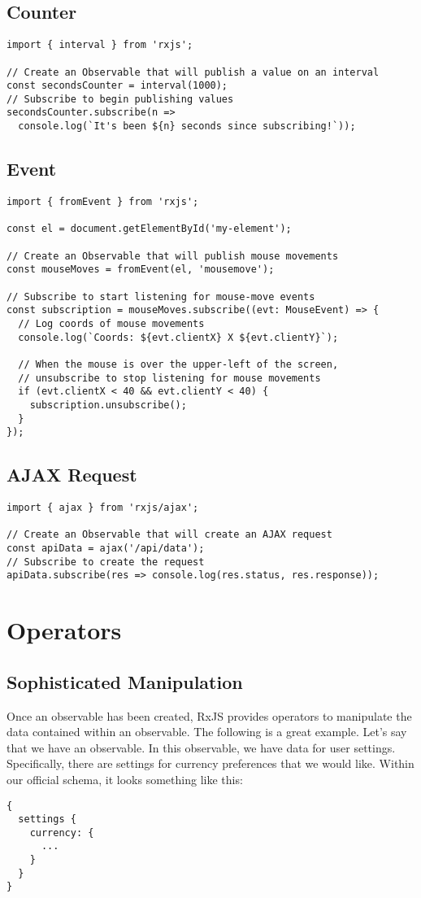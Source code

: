 \subsection{Counter}
\begin{lstlisting}
import { interval } from 'rxjs';

// Create an Observable that will publish a value on an interval
const secondsCounter = interval(1000);
// Subscribe to begin publishing values
secondsCounter.subscribe(n =>
  console.log(`It's been ${n} seconds since subscribing!`));
\end{lstlisting}

\subsection{Event}
\begin{lstlisting}
import { fromEvent } from 'rxjs';

const el = document.getElementById('my-element');

// Create an Observable that will publish mouse movements
const mouseMoves = fromEvent(el, 'mousemove');

// Subscribe to start listening for mouse-move events
const subscription = mouseMoves.subscribe((evt: MouseEvent) => {
  // Log coords of mouse movements
  console.log(`Coords: ${evt.clientX} X ${evt.clientY}`);

  // When the mouse is over the upper-left of the screen,
  // unsubscribe to stop listening for mouse movements
  if (evt.clientX < 40 && evt.clientY < 40) {
    subscription.unsubscribe();
  }
});
\end{lstlisting}

\subsection{AJAX Request}
\begin{lstlisting}
import { ajax } from 'rxjs/ajax';

// Create an Observable that will create an AJAX request
const apiData = ajax('/api/data');
// Subscribe to create the request
apiData.subscribe(res => console.log(res.status, res.response));
\end{lstlisting}

\section{Operators}

\subsection{Sophisticated Manipulation}
Once an observable has been created, RxJS provides operators to manipulate 
the data contained within an observable. The following is a great example. Let's
say that we have an observable. In this observable, we have data for user 
settings. Specifically, there are settings for currency preferences that we 
would like. Within our official schema, it looks something like this: 
\begin{lstlisting}
{
  settings {
    currency: {
      ...
    }
  }
}  
\end{lstlisting}

